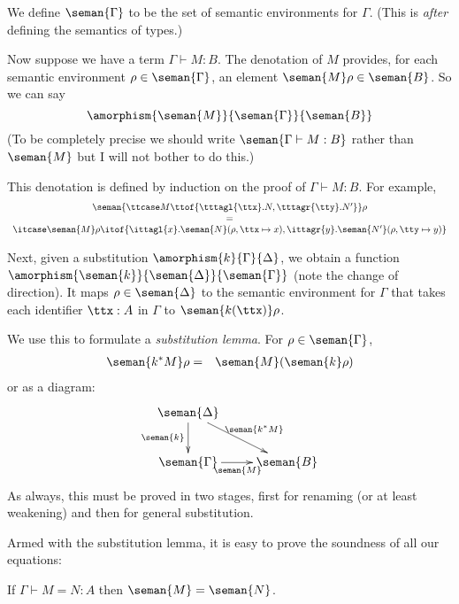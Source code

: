\documentclass[runningheads,12pt]{llncs}
\begin{document}
We define $\seman{\Gamma}$ to be the set of semantic environments for $\Gamma$.  (This is \emph{after} defining the semantics of types.)

Now suppose we have a term $\Gamma \vdash M : B$.  The denotation of $M$ provides, for each semantic environment $\rho \in \seman{\Gamma}$, an element $\seman{M}\rho \in \seman{B}$.  So we can say
\begin{displaymath}
  \amorphism{\seman{M}}{\seman{\Gamma}}{\seman{B}}
\end{displaymath}
(To be completely precise we should write $\seman{\Gamma \vdash M : B}$ rather than $\seman{M}$ but I will not bother to do this.)

This denotation is defined by induction on the proof of $\Gamma \vdash M : B$.  For example,
\begin{displaymath}
\begin{array}{c}
  \seman{\ttcase M \ttof \{\tttagl{\ttx}. N, \tttagr{\tty}. N' \} }\rho \\ = \\  \itcase \seman{M}\rho \itof \{ \ittagl{x}.\seman{N}(\rho, \ttx \mapsto x), \ittagr{y}.\seman{N'}(\rho, \tty \mapsto y) \}
\end{array}
\end{displaymath}

Next, given a substitution $\amorphism{k}{\Gamma}{\Delta}$, we obtain a function $\amorphism{\seman{k}}{\seman{\Delta}}{\seman{\Gamma}}$ (note the change of direction).  It maps $\rho \in \seman{\Delta}$ to the semantic environment for $\Gamma$ that takes each identifier $\ttx:A$ in $\Gamma$ to $\seman{k(\ttx)}\rho$.

We use this to formulate a \emph{substitution lemma}.  For $\rho \in \seman{\Gamma}$, 
\begin{eqnarray*}
  \seman{k^{*}M}\rho & = & \seman{M}(\seman{k}\rho)
\end{eqnarray*}
or as a diagram:
    \begin{displaymath}
\xymatrix{
      \seman{\Delta} \ar[d]_{\seman{k}} \ar[dr]^{\seman{k^*M}} & \\
      \seman{\Gamma} \ar[r]_{\seman{M}} & \seman{B} \\
}
    \end{displaymath}
As always, this must be proved in two stages, first for renaming (or at least weakening) and then for general substitution.

Armed with the substitution lemma, it is easy to prove the soundness of all our equations:
\begin{proposition}
  If $\Gamma \vdash M = N : A$ then $\seman{M} = \seman{N}$. 
\end{proposition}
\end{document}
